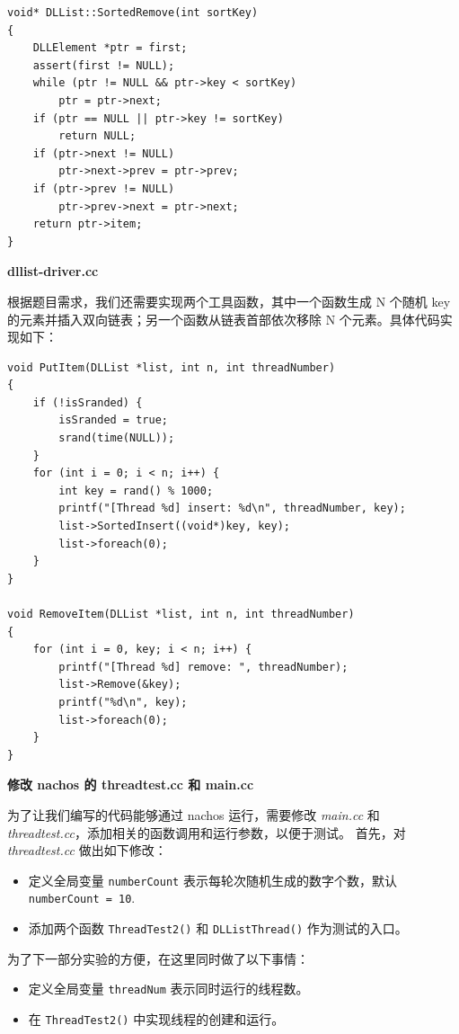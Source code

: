 \documentclass[a4paper,12pt]{article}
\begin{document}
\begin{verbatim}
void* DLList::SortedRemove(int sortKey)
{
    DLLElement *ptr = first;
    assert(first != NULL);
    while (ptr != NULL && ptr->key < sortKey)
        ptr = ptr->next;
    if (ptr == NULL || ptr->key != sortKey)
        return NULL;
    if (ptr->next != NULL)
        ptr->next->prev = ptr->prev;
    if (ptr->prev != NULL)
        ptr->prev->next = ptr->next;
    return ptr->item;
}
\end{verbatim}

\par\textbf{dllist-driver.cc}

\par 根据题目需求，我们还需要实现两个工具函数，其中一个函数生成 N 个随机 key 的元素并插入双向链表；另一个函数从链表首部依次移除 N 个元素。具体代码实现如下：

\begin{verbatim}
void PutItem(DLList *list, int n, int threadNumber) 
{ 
    if (!isSranded) { 
        isSranded = true; 
        srand(time(NULL)); 
    } 
    for (int i = 0; i < n; i++) { 
        int key = rand() % 1000; 
        printf("[Thread %d] insert: %d\n", threadNumber, key); 
        list->SortedInsert((void*)key, key); 
        list->foreach(0); 
    } 
} 
 
void RemoveItem(DLList *list, int n, int threadNumber) 
{ 
    for (int i = 0, key; i < n; i++) { 
        printf("[Thread %d] remove: ", threadNumber); 
        list->Remove(&key); 
        printf("%d\n", key); 
        list->foreach(0); 
    } 
}
\end{verbatim}


\par\textbf{修改 nachos 的 threadtest.cc 和 main.cc}

为了让我们编写的代码能够通过 nachos 运行，需要修改 \textit{main.cc} 和 \textit{threadtest.cc}，添加相关的函数调用和运行参数，以便于测试。
首先，对 \textit{threadtest.cc} 做出如下修改：
\begin{itemize}
\item 定义全局变量 \texttt{numberCount} 表示每轮次随机生成的数字个数，默认 \texttt{numberCount = 10}.
\item 添加两个函数 \texttt{ThreadTest2()} 和 \texttt{DLListThread()} 作为测试的入口。
\end{itemize}
为了下一部分实验的方便，在这里同时做了以下事情：
\begin{itemize}
\item 定义全局变量 \texttt{threadNum} 表示同时运行的线程数。
\item 在 \texttt{ThreadTest2()} 中实现线程的创建和运行。    
\end{itemize}
\end{document}
